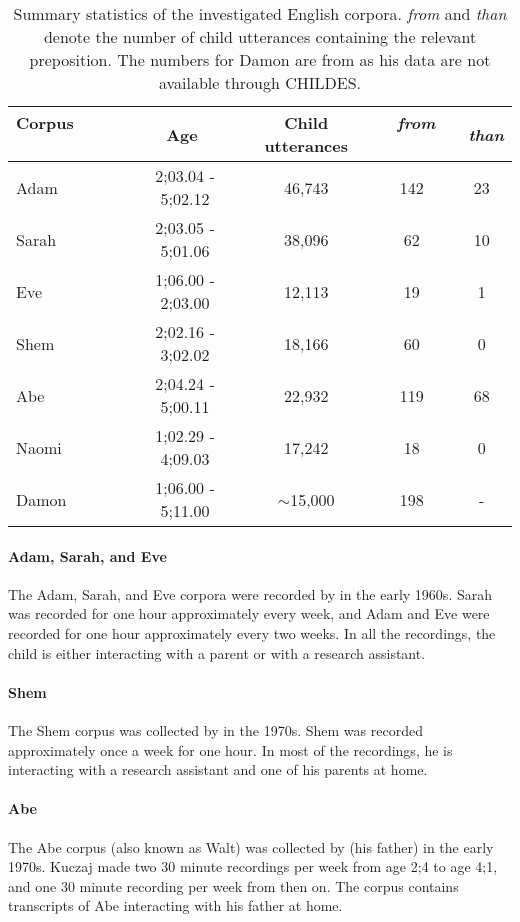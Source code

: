 \documentclass[lucida]{sp} %
\begin{document}
\begin{table}
\begin{tabularx}{\textwidth}{l | c | c | c | c  }
Corpus \ \ \ \ \ \ \ & \ \ \ Age \ \ \ & Child utterances & \  \textit{from} \   \ & \   \textit{than} \\ \hline
Adam & 2;03.04 - 5;02.12& 46,743 & 142  & 23\\
Sarah & 2;03.05 - 5;01.06 & 38,096 & 62 & 10 \\
Eve & 1;06.00 - 2;03.00 & 12,113 & 19 & 1\\
Shem & 2;02.16 - 3;02.02 & 18,166 & 60 & 0\\
Abe &2;04.24 - 5;00.11& 22,932 & 119 & 68 \\
Naomi & 1;02.29 - 4;09.03 & 17,242 & 18 & 0 \\
Damon & 1;06.00 - 5;11.00 & $\sim$15,000 & 198 & - \\ 
\end{tabularx}
\caption{Summary statistics of the investigated English corpora. \textit{from} and \textit{than} denote the number of child utterances containing the relevant preposition. The numbers for Damon are from \cite{clark1989a} as his data are not available through CHILDES.}\label{tbl:corpus-stats-en}
\end{table}


\paragraph{Adam, Sarah, and Eve} The Adam, Sarah, and Eve corpora were recorded by \cite{brown1973} in the early 1960s.  Sarah was recorded for one hour approximately every week, and Adam and Eve were recorded for one hour approximately every two weeks. In all the recordings, the child is either interacting with a parent or with a research assistant. 

\paragraph{Shem} The Shem corpus was collected by \cite{clark1978} in the 1970s. Shem was recorded approximately once a week for one hour. In most of the recordings, he is interacting with a research assistant and one of his parents at home.

\paragraph{Abe} The Abe corpus (also known as Walt) was collected by \cite{kuczaj1977} (his father) in the early 1970s. Kuczaj made two 30 minute recordings per week from age 2;4 to age 4;1, and one 30 minute recording per week from then on. The corpus contains transcripts of Abe interacting with his father at home.
\end{document}

